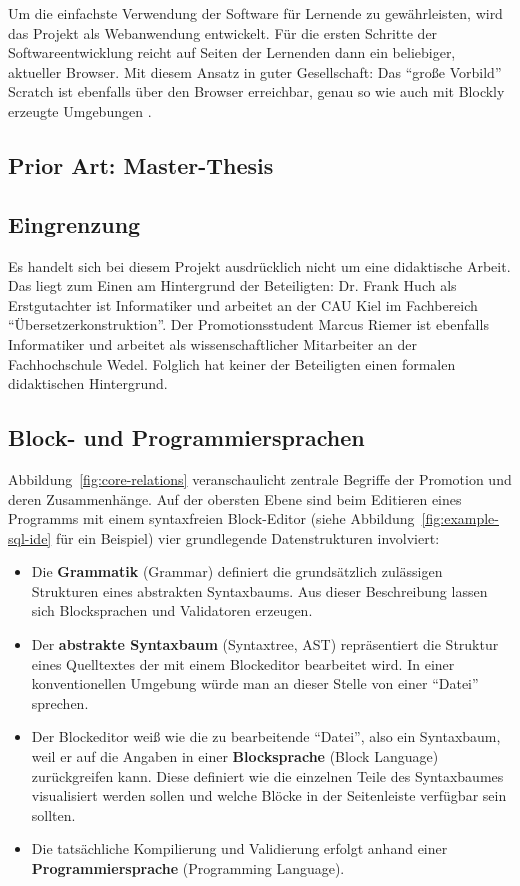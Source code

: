 \documentclass[paper=a4,fontsize=12pt,parskip=half]{scrartcl}
\begin{document}
Um die einfachste Verwendung der Software für Lernende zu gewährleisten, wird das Projekt als Webanwendung entwickelt. Für die ersten Schritte der Softwareentwicklung reicht auf Seiten der Lernenden dann ein beliebiger, aktueller Browser. Mit diesem Ansatz in guter Gesellschaft: Das \enquote{große Vorbild} Scratch ist ebenfalls über den Browser erreichbar, genau so wie auch mit Blockly erzeugte Umgebungen \cite[vgl. S. 28]{riemer_blattwerkzeug_2016}.

\subsection{Prior Art: Master-Thesis}

\subsection{Eingrenzung}

Es handelt sich bei diesem Projekt ausdrücklich nicht um eine didaktische Arbeit. Das liegt zum Einen am Hintergrund der Beteiligten: Dr. Frank Huch als Erstgutachter ist Informatiker und arbeitet an der CAU Kiel im Fachbereich \enquote{Übersetzerkonstruktion}. Der Promotionsstudent Marcus Riemer ist ebenfalls Informatiker und arbeitet als wissenschaftlicher Mitarbeiter an der Fachhochschule Wedel. Folglich hat keiner der Beteiligten einen formalen didaktischen Hintergrund.

\subsection{Block- und Programmiersprachen}

Abbildung~\ref{fig:core-relations} veranschaulicht zentrale Begriffe der Promotion und deren Zusammenhänge. Auf der obersten Ebene sind beim Editieren eines Programms mit einem syntaxfreien Block-Editor (siehe Abbildung~\ref{fig:example-sql-ide} für ein Beispiel) vier grundlegende Datenstrukturen involviert:

\begin{itemize}
\item Die \textbf{Grammatik} (Grammar) definiert die grundsätzlich zulässigen Strukturen eines abstrakten Syntaxbaums. Aus dieser Beschreibung lassen sich Blocksprachen und Validatoren erzeugen.
\item Der \textbf{abstrakte Syntaxbaum} (Syntaxtree, AST) repräsentiert die Struktur eines Quelltextes der mit einem Blockeditor bearbeitet wird. In einer konventionellen Umgebung würde man an dieser Stelle von einer \enquote{Datei} sprechen.
\item Der Blockeditor weiß wie die zu bearbeitende \enquote{Datei}, also ein Syntaxbaum, weil er auf die Angaben in einer \textbf{Blocksprache} (Block Language) zurückgreifen kann. Diese definiert wie die einzelnen Teile des Syntaxbaumes visualisiert werden sollen und welche Blöcke in der Seitenleiste verfügbar sein sollten.
\item Die tatsächliche Kompilierung und Validierung erfolgt anhand einer \textbf{Programmiersprache} (Programming Language).
\end{itemize}
\end{document}
